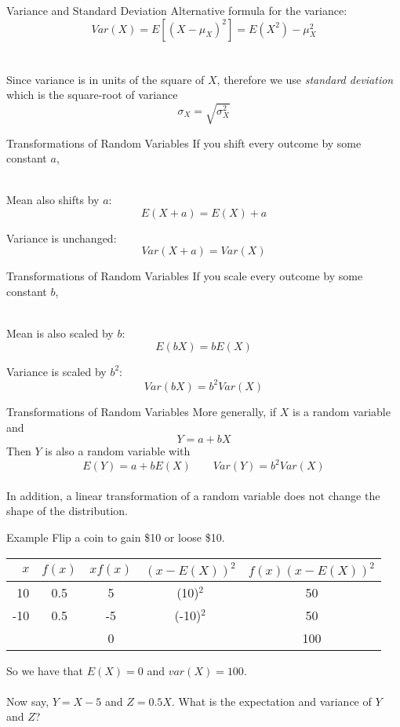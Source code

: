 \documentclass{./../div_teaching_slides}
\begin{document}
\begin{frame}{Variance and Standard Deviation}
Alternative formula for the variance:  $$Var(X) = E[(X-\mu_X)^2] = E(X^2)-\mu_X^2$$ \\~\\
Since variance is in units of the square of $X$, therefore we use \textit{standard deviation} which is the square-root of variance
$$ \sigma_X = \sqrt{\sigma^2_X}  $$
\end{frame}

\begin{frame}{Transformations of Random Variables}
 If you shift every outcome by some constant  $a$, \\~\\
  \begin{witemize}
  \item Mean also shifts by $a$:
  $$E(X + a) = E(X) + a $$
  \item Variance is unchanged: 
   $$ Var(X + a) = Var(X) $$
  \end{witemize}
\end{frame}

\begin{frame}{Transformations of Random Variables}
 If you scale every outcome by some constant $b$, \\~\\
  \begin{witemize}
  \item Mean is also scaled by $b$:
  $$E(bX) = bE(X) $$
  \item Variance is scaled by $b^2$:
   $$ Var(bX) = b^2 Var(X) $$
  \end{witemize}
\end{frame}

\begin{frame}{Transformations of Random Variables}
More generally, if $X$ is a random variable and $$Y=a+bX$$
Then $Y$ is also a random variable with 
$$ E(Y) = a + b E(X) \quad \quad Var(Y) = b^2 Var(X) $$ \\
In addition, a linear transformation of a random variable does not change the shape of the distribution. 
\end{frame}

\begin{frame}{Example}
Flip a coin to gain \$10 or loose \$10. 
\begin{center}
\renewcommand*{\arraystretch}{1.25}
\begin{tabularx}{0.9\textwidth}{rcccc}
$x$ & $f(x)$ & $xf(x)$ & $(x-E(X))^2$ & $f(x)(x-E(X))^2$\\
\hline
10 & 0.5 & 5 & (10)$^2$ & 50 \\
-10 & 0.5 & -5 & (-10)$^2$ & 50  \\
\hline
& & 0 & & 100 \\
\hline
\end{tabularx}
\end{center}
So we have that $E(X) = 0$ and $var(X)=100$. \\~\\
Now say, $Y = X-5$ and $Z=0.5X$. What is the expectation and variance of $Y$ and $Z$?
\end{frame}
\end{document}
